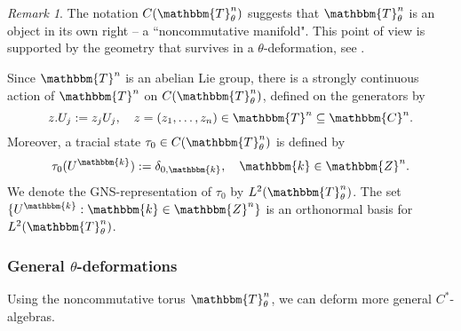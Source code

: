 \documentclass[10pt]{amsart}
\theoremstyle{remark}
\newtheorem{remark}[thm]{Remark}
\theoremstyle{definition}
\begin{document}
\begin{remark}
The notation $C({\mathbbm{T}}^n_\theta)$ suggests that ${\mathbbm{T}}^n_\theta$ is an object in its own right -- a ``noncommutative manifold". This point of view is supported by the geometry that survives in a $\theta$-deformation, see \cite{conneslandi,yamashitadeform}. 
\end{remark}

Since ${\mathbbm{T}}^n$ is an abelian Lie group, there is a strongly continuous action of ${\mathbbm{T}}^n$ on $C({\mathbbm{T}}^n_\theta)$, defined on the generators by 
$$z.U_j:=z_jU_j, \quad z=(z_1,\ldots, z_n)\in {\mathbbm{T}}^n\subseteq {\mathbbm{C}}^n.$$
Moreover, a tracial state $\tau_0\in C({\mathbbm{T}}^n_\theta)$ is defined by 
$$\tau_0(U^\mathbbm{k}):=\delta_{0,\mathbbm{k}}, \quad \mathbbm{k}\in {\mathbbm{Z}}^n.$$
We denote the GNS-representation of $\tau_0$ by $L^2({\mathbbm{T}}^n_\theta)$. The set $\{U^\mathbbm{k}:\mathbbm{k}\in {\mathbbm{Z}}^n\}$ is an orthonormal basis for $L^2({\mathbbm{T}}^n_\theta)$. 

\subsubsection{General $\theta$-deformations} 
Using the noncommutative torus ${\mathbbm{T}}^n_\theta$, we can deform more general $C^*$-algebras. 
\end{document}
